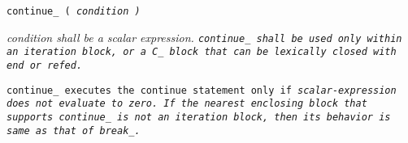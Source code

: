 
\tt{continue_ (} \it{condition} \tt{)}


\it{condition} shall be a scalar expression.
\tt{continue_} shall be used only within an iteration block,
or a C\_ block that can be lexically closed with \tt{end} or \tt{refed}.


\tt{continue_} executes the \tt{continue} statement only if
\it{scalar-expression} does not evaluate to zero.
If the nearest enclosing block that supports \tt{continue_} is not
an iteration block, then its behavior is same as that of \tt{break_}.
